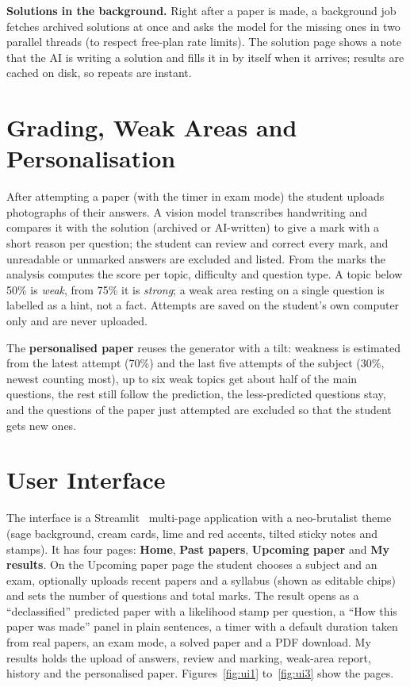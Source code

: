 \documentclass[11pt,a4paper]{article}
\begin{document}
\textbf{Solutions in the background.} Right after a paper is made, a background job fetches archived solutions at once and
asks the model for the missing ones in two parallel threads (to respect free-plan rate limits). The solution page shows a note
that the AI is writing a solution and fills it in by itself when it arrives; results are cached on disk, so repeats are
instant.

\section{Grading, Weak Areas and Personalisation}
\label{sec:feature5}

After attempting a paper (with the timer in exam mode) the student uploads photographs of their answers. A vision model
transcribes handwriting and compares it with the solution (archived or AI-written) to give a mark with a short reason per
question; the student can review and correct every mark, and unreadable or unmarked answers are excluded and listed. From the
marks the analysis computes the score per topic, difficulty and question type. A topic below 50\% is \emph{weak}, from 75\% it is
\emph{strong}; a weak area resting on a single question is labelled as a hint, not a fact. Attempts are saved on the student's
own computer only and are never uploaded.

The \textbf{personalised paper} reuses the generator with a tilt: weakness is estimated from the latest attempt (70\%) and the
last five attempts of the subject (30\%, newest counting most), up to six weak topics get about half of the main questions,
the rest still follow the prediction, the less-predicted questions stay, and the questions of the paper just attempted are
excluded so that the student gets new ones.

\section{User Interface}
\label{sec:ui}

The interface is a Streamlit~\cite{streamlit} multi-page application with a neo-brutalist theme (sage background, cream cards, lime and red
accents, tilted sticky notes and stamps). It has four pages: \textbf{Home}, \textbf{Past papers}, \textbf{Upcoming paper} and
\textbf{My results}. On the Upcoming paper page the student chooses a subject and an exam, optionally uploads recent papers
and a syllabus (shown as editable chips) and sets the number of questions and total marks. The result opens as a
``declassified'' predicted paper with a likelihood stamp per question, a ``How this paper was made'' panel in plain sentences, a
timer with a default duration taken from real papers, an exam mode, a solved paper and a PDF download. My results holds the
upload of answers, review and marking, weak-area report, history and the personalised paper. Figures~\ref{fig:ui1}
to~\ref{fig:ui3} show the pages.
\end{document}
